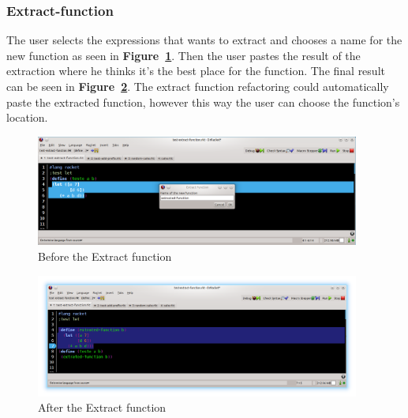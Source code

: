 \subsubsection{Extract-function}
The user selects the expressions that wants to extract and chooses a name for the new function as seen in {\bf Figure~\ref{fig:extractBefore}}.
Then the user pastes the result of the extraction where he thinks it's the best place for the function. 
The final result can be seen in {\bf Figure~\ref{fig:extractAfter}}.
The extract function refactoring could automatically paste the extracted function, however this way the user can choose the function's location.
\begin{figure}[htbp]
	\centering
	\includegraphics[width=0.95\textwidth]{img/extract1.png}
	\caption{Before the Extract function}
	\label{fig:extractBefore}
\end{figure}

\begin{figure}[htbp]
	\centering
	\includegraphics[width=0.95\textwidth]{img/extract2.png}
	\caption{After the Extract function}
	\label{fig:extractAfter}
\end{figure}

